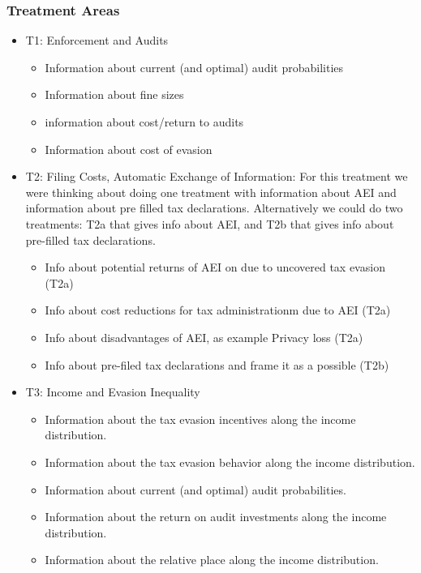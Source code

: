 \documentclass[a4paper, 12pt]{article}
\begin{document}
\subsubsection{Treatment Areas}
\begin{itemize}
    \item T1: Enforcement and Audits
    \begin{itemize}
        \item Information about current (and optimal) audit probabilities
        \item Information about fine sizes
        \item information about cost/return to audits
        \item Information about cost of evasion
    \end{itemize}
    \item T2: Filing Costs, Automatic Exchange of Information: For this treatment we were thinking about doing one treatment with information about AEI and information about pre filled tax declarations. Alternatively we could do two treatments: T2a that gives info about AEI, and T2b that gives info about pre-filled tax declarations.
    \begin{itemize}
        \item Info about potential returns of AEI on due to uncovered tax evasion (T2a)
        \item Info about cost reductions for tax administrationm due to AEI (T2a)
        \item Info about disadvantages of AEI, as example Privacy loss (T2a)
        \item Info about pre-filed tax declarations and frame it as a possible (T2b) 
    \end{itemize}
    \item T3: Income and Evasion Inequality
    \begin{itemize}
        \item Information about the tax evasion incentives along the income distribution.
        \item Information about the tax evasion behavior along the income distribution.
        \item Information about current (and optimal) audit probabilities.
        \item Information about the return on audit investments along the income distribution.
        \item Information about the relative place along the income distribution.
    \end{itemize}
\end{itemize}
\end{document}
